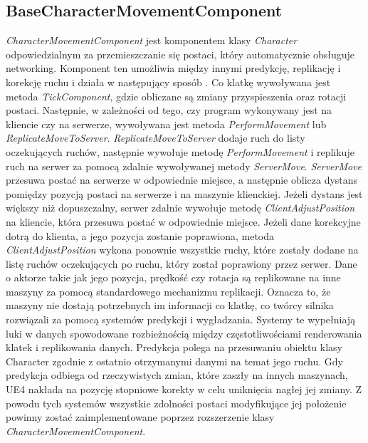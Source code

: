 \documentclass[multip]{SGGW-thesis}
\begin{document}
\subsection{BaseCharacterMovementComponent}
{\em CharacterMovementComponent} jest komponentem klasy {\em Character} odpowiedzialnym za przemieszczanie się postaci, który automatycznie obsługuje networking. Komponent ten umożliwia między innymi predykcję, replikację i korekcję ruchu i działa w następujący sposób \cite{docs-charactermovementcomponent}. Co klatkę wywoływana jest metoda {\em TickComponent}, gdzie obliczane są zmiany przyspieszenia oraz rotacji postaci. Następnie, w zależności od tego, czy program wykonywany jest na kliencie czy na serwerze, wywoływana jest metoda {\em PerformMovement} lub {\em ReplicateMoveToServer}. {\em ReplicateMoveToServer} dodaje ruch do listy oczekujących ruchów, następnie wywołuje metodę {\em PerformMovement} i replikuje ruch na serwer za pomocą zdalnie wywoływanej metody {\em ServerMove}. {\em ServerMove} przesuwa postać na serwerze w odpowiednie miejsce, a następnie oblicza dystans pomiędzy pozycją postaci na serwerze i na maszynie klienckiej. Jeżeli dystans jest większy niż dopuszczalny, serwer zdalnie wywołuje metodę {\em ClientAdjustPosition} na kliencie, która przesuwa postać w odpowiednie miejsce. Jeżeli dane korekcyjne dotrą do klienta, a jego pozycja zostanie poprawiona, metoda {\em ClientAdjustPosition} wykona ponownie wszystkie ruchy, które zostały dodane na listę ruchów oczekujących po ruchu, który został poprawiony przez serwer.
\newline \indent Dane o aktorze takie jak jego pozycja, prędkość czy rotacja są replikowane na inne maszyny za pomocą standardowego mechanizmu replikacji. Oznacza to, że maszyny nie dostają potrzebnych im informacji co klatkę, co twórcy silnika rozwiązali za pomocą systemów predykcji i wygładzania. Systemy te wypełniają luki w danych spowodowane rozbieżnością między częstotliwościami renderowania klatek i replikowania danych. Predykcja polega na przesuwaniu obiektu klasy Character zgodnie z ostatnio otrzymanymi danymi na temat jego ruchu. Gdy predykcja odbiega od rzeczywistych zmian, które zaszły na innych maszynach, UE4 nakłada na pozycję stopniowe korekty w celu uniknięcia nagłej jej zmiany.
\newline \indent Z powodu tych systemów wszystkie zdolności postaci modyfikujące jej położenie powinny zostać zaimplementowane poprzez rozszerzenie klasy {\em CharacterMovementComponent}.
\end{document}
